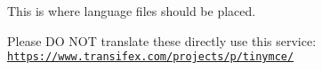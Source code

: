 This is where language files should be placed.

Please D\+O N\+O\+T translate these directly use this service\+: \href{https://www.transifex.com/projects/p/tinymce/}{\tt https\+://www.\+transifex.\+com/projects/p/tinymce/} 